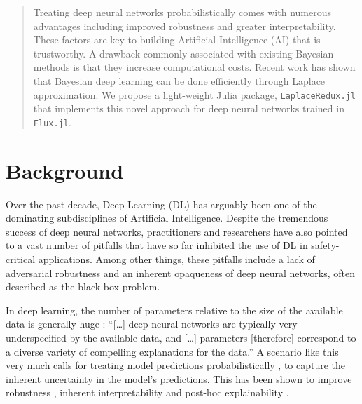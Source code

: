 \documentclass{juliacon}
\begin{document}


\maketitle

\begin{abstract}

Treating deep neural networks probabilistically comes with numerous advantages including improved robustness and greater interpretability. These factors are key to building Artificial Intelligence (AI) that is trustworthy. A drawback commonly associated with existing Bayesian methods is that they increase computational costs. Recent work has shown that Bayesian deep learning can be done efficiently through Laplace approximation. We propose a light-weight Julia package, \texttt{LaplaceRedux.jl} that implements this novel approach for deep neural networks trained in \texttt{Flux.jl}.

\end{abstract}

\section{Background}\label{sec-intro}

Over the past decade, Deep Learning (DL) has arguably been one of the
dominating subdisciplines of Artificial Intelligence. Despite the
tremendous success of deep neural networks, practitioners and
researchers have also pointed to a vast number of pitfalls that have so
far inhibited the use of DL in safety-critical applications. Among other
things, these pitfalls include a lack of adversarial robustness
\cite{goodfellow2014explaining} and an inherent opaqueness of deep
neural networks, often described as the black-box problem.

In deep learning, the number of parameters relative to the size of the
available data is generally huge \cite{wilson2020case}: ``{[}\ldots{]}
deep neural networks are typically very underspecified by the available
data, and {[}\ldots{]} parameters {[}therefore{]} correspond to a
diverse variety of compelling explanations for the data.'' A scenario
like this very much calls for treating model predictions
probabilistically \cite{wilson2020case}, to capture the inherent
uncertainty in the model's predictions. This has been shown to improve
robustness \cite{daxberger2021laplace}, inherent interpretability
\cite{ish-horowicz2019interpreting} and post-hoc explainability
\cite{schut2021generating,altmeyer2023faithful}.
\end{document}
